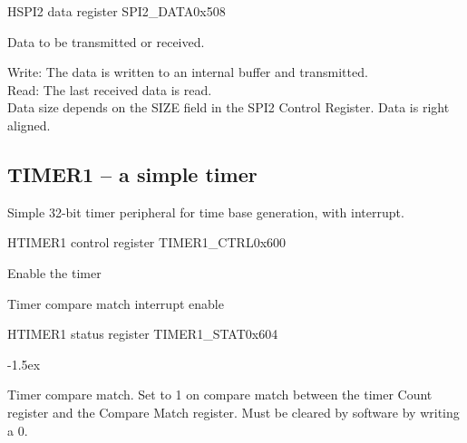 \documentclass[12pt]{article}
\begin{document}
\begin{register}{H}{SPI2 data register SPI2\_DATA}{0x508}
\label{spi2data}
\regnewline%
\end{register}
\begin{regdesc}[0.8\textwidth]\begin{reglist}[000000000]
\item [DATA] Data to be transmitted or received.
\end{reglist}\end{regdesc}
Write: The data is written to an internal buffer and transmitted.\\
Read: The last received data is read.\\
Data size depends on the SIZE field in the SPI2 Control Register. Data is right aligned.


\subsection{TIMER1 -- a simple timer}
Simple 32-bit timer peripheral for time base generation, with interrupt.

\begin{register}{H}{TIMER1 control register TIMER1\_CTRL}{0x600}
\label{timer1ctrl}
%
%
%
\regnewline%
\end{register}
\begin{regdesc}[0.8\textwidth]\begin{reglist}[0000]
\item[EN] Enable the timer
\item[TCIE] Timer compare match interrupt enable
\end{reglist}\end{regdesc}

\begin{register}{H}{TIMER1 status register TIMER1\_STAT}{0x604}
\label{timer1stat}
%
%
\regnewline%
\end{register}
\begin{regdesc}[0.8\textwidth]\begin{reglist}[0000]
\itemsep-1.5ex
\item[TCI] Timer compare match. Set to 1 on compare match between the timer Count register and the Compare Match register. Must be cleared by software by writing a 0.
\end{reglist}\end{regdesc}
\end{document}
